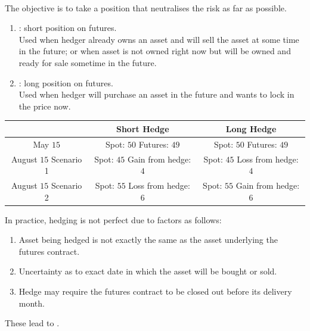 \documentclass[a4paper,oneside,openany]{book}
\begin{document}
\begin{definition}
\\
The objective is to take a position that neutralises the risk as far as possible.
\begin{enumerate}[label=\roman*.]
\setlength{\itemsep}{0pt}
\item {}: short position on futures. \\
Used when hedger already owns an asset and will sell the asset at some time in the future; or when asset is not owned right now but will be owned and ready for sale sometime in the future.
\item {}: long position on futures. \\
Used when hedger will purchase an asset in the future and wants to lock in the price now.
\end{enumerate}
\begin{table}[H]
\begin{tabular}{|c | c | c|}
\hline
 & \textbf{Short Hedge} & \textbf{Long Hedge} \\ \hline
May $15$ & \makecell[l]{Spot: $50$ \\ Futures: $49$} & \makecell[l]{Spot: $50$ \\ Futures: $49$} \\ \hline
August $15$ Scenario 1 & \makecell[l]{Spot: $45$ \\ Gain from hedge: $4$} &  \makecell[l]{Spot: $45$ \\ Loss from hedge: $4$} \\ \hline
August $15$ Scenario 2 & \makecell[l]{Spot: $55$ \\ Loss from hedge: $6$} & \makecell[l]{Spot: $55$ \\ Gain from hedge: $6$} \\ \hline
\end{tabular}
\end{table}
\end{definition}

In practice, hedging is not perfect due to factors as follows:
\begin{enumerate}[label=\arabic*.]
\setlength{\itemsep}{0pt}
\item Asset being hedged is not exactly the same as the asset underlying the futures contract.
\item Uncertainty as to exact date in which the asset will be bought or sold.
\item Hedge may require the futures contract to be closed out before its delivery month.
\end{enumerate}
These lead to .
\end{document}
